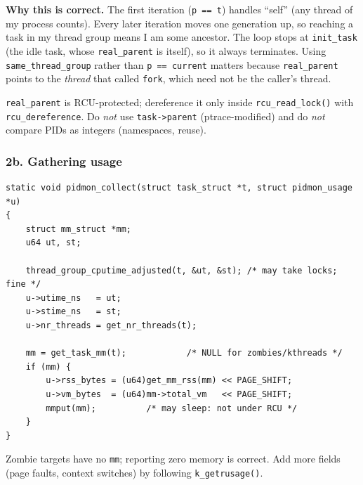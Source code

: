 \documentclass[11pt,a4paper]{article}
\begin{document}
\textbf{Why this is correct.}
The first iteration (\texttt{p == t}) handles ``self'' (any thread of my process counts). Every later iteration moves one generation up, so reaching a task in my thread group means I am some ancestor. The loop stops at \texttt{init\_task} (the idle task, whose \texttt{real\_parent} is itself), so it always terminates. Using \texttt{same\_thread\_group} rather than \texttt{p == current} matters because \texttt{real\_parent} points to the \emph{thread} that called \texttt{fork}, which need not be the caller's thread.

\begin{warn}
\texttt{real\_parent} is RCU-protected; dereference it only inside \texttt{rcu\_read\_lock()} with \texttt{rcu\_dereference}. Do \emph{not} use \texttt{task->parent} (ptrace-modified) and do \emph{not} compare PIDs as integers (namespaces, reuse).
\end{warn}

\subsubsection*{2b. Gathering usage}
\begin{lstlisting}
static void pidmon_collect(struct task_struct *t, struct pidmon_usage *u)
{
	struct mm_struct *mm;
	u64 ut, st;

	thread_group_cputime_adjusted(t, &ut, &st);	/* may take locks; fine */
	u->utime_ns   = ut;
	u->stime_ns   = st;
	u->nr_threads = get_nr_threads(t);

	mm = get_task_mm(t);			/* NULL for zombies/kthreads */
	if (mm) {
		u->rss_bytes = (u64)get_mm_rss(mm) << PAGE_SHIFT;
		u->vm_bytes  = (u64)mm->total_vm   << PAGE_SHIFT;
		mmput(mm);			/* may sleep: not under RCU */
	}
}
\end{lstlisting}
Zombie targets have no \texttt{mm}; reporting zero memory is correct. Add more fields (page faults, context switches) by following \texttt{k\_getrusage()}.
\end{document}
